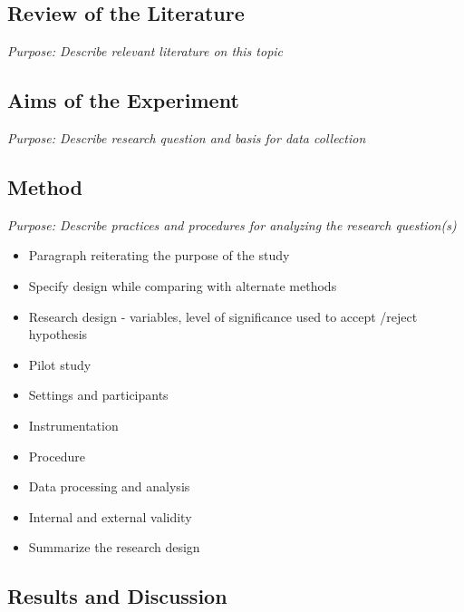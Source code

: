 \subsection{Review of the Literature}
\label{reviewoftheliterature}

\emph{Purpose: Describe relevant literature on this topic}

\subsection{Aims of the Experiment}
\label{aimsoftheexperiment}

\emph{Purpose: Describe research question and basis for data collection}

\subsection{Method}
\label{method}

\emph{Purpose: Describe practices and procedures for analyzing the research question(s)}

\begin{itemize}
\item Paragraph reiterating the purpose of the study

\item Specify design while comparing with alternate methods

\item Research design - variables, level of significance used to accept \slash  reject hypothesis

\item Pilot study

\item Settings and participants

\item Instrumentation

\item Procedure

\item Data processing and analysis

\item Internal and external validity

\item Summarize the research design

\end{itemize}

\subsection{Results and Discussion}
\label{resultsanddiscussion}

